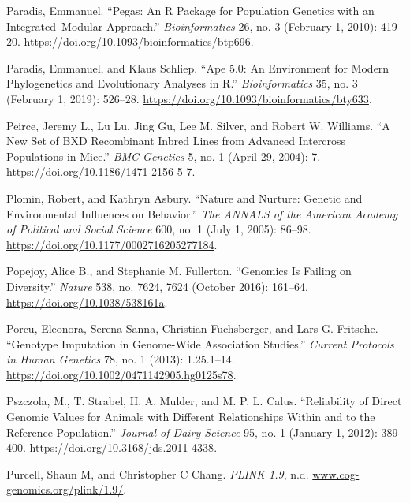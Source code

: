 \documentclass[
  9pt,
]{book}
\newlength{\cslhangindent}
\newlength{\cslentryspacingunit} %
\newenvironment{CSLReferences}[2] %
 {%
  \setlength{\parindent}{0pt}
  \ifodd #1
  \let\oldpar\par
  \def\par{\hangindent=\cslhangindent\oldpar}
  \fi
  \setlength{\parskip}{#2\cslentryspacingunit}
 }%
 {}
\begin{document}
\begin{CSLReferences}{1}{0}
\leavevmode{}%
Paradis, Emmanuel. {``Pegas: An {R} Package for Population Genetics with an Integrated--Modular Approach.''} \emph{Bioinformatics} 26, no. 3 (February 1, 2010): 419--20. \url{https://doi.org/10.1093/bioinformatics/btp696}.

\leavevmode{}%
Paradis, Emmanuel, and Klaus Schliep. {``Ape 5.0: An Environment for Modern Phylogenetics and Evolutionary Analyses in {R}.''} \emph{Bioinformatics} 35, no. 3 (February 1, 2019): 526--28. \url{https://doi.org/10.1093/bioinformatics/bty633}.

\leavevmode{}%
Peirce, Jeremy L., Lu Lu, Jing Gu, Lee M. Silver, and Robert W. Williams. {``A New Set of {BXD} Recombinant Inbred Lines from Advanced Intercross Populations in Mice.''} \emph{BMC Genetics} 5, no. 1 (April 29, 2004): 7. \url{https://doi.org/10.1186/1471-2156-5-7}.

\leavevmode{}%
Plomin, Robert, and Kathryn Asbury. {``Nature and {Nurture}: {Genetic} and {Environmental Influences} on {Behavior}.''} \emph{The ANNALS of the American Academy of Political and Social Science} 600, no. 1 (July 1, 2005): 86--98. \url{https://doi.org/10.1177/0002716205277184}.

\leavevmode{}%
Popejoy, Alice B., and Stephanie M. Fullerton. {``Genomics Is Failing on Diversity.''} \emph{Nature} 538, no. 7624, 7624 (October 2016): 161--64. \url{https://doi.org/10.1038/538161a}.

\leavevmode{}%
Porcu, Eleonora, Serena Sanna, Christian Fuchsberger, and Lars G. Fritsche. {``Genotype {Imputation} in {Genome-Wide Association Studies}.''} \emph{Current Protocols in Human Genetics} 78, no. 1 (2013): 1.25.1--14. \url{https://doi.org/10.1002/0471142905.hg0125s78}.

\leavevmode{}%
Pszczola, M., T. Strabel, H. A. Mulder, and M. P. L. Calus. {``Reliability of Direct Genomic Values for Animals with Different Relationships Within and to the Reference Population.''} \emph{Journal of Dairy Science} 95, no. 1 (January 1, 2012): 389--400. \url{https://doi.org/10.3168/jds.2011-4338}.

\leavevmode{}%
Purcell, Shaun M, and Christopher C Chang. \emph{{PLINK} 1.9}, n.d. \href{https://www.cog-genomics.org/plink/1.9/}{www.cog-genomics.org/plink/1.9/}.


\end{CSLReferences}
\end{document}
